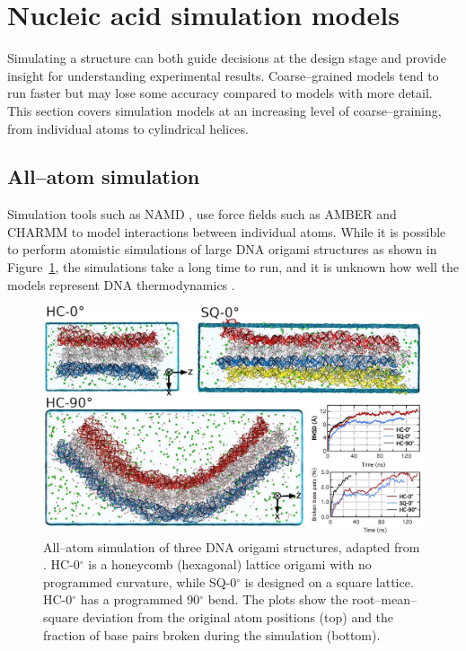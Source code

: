 \section{Nucleic acid simulation models}
Simulating a structure can both guide decisions at the design stage and provide insight for understanding experimental results. Coarse--grained models tend to run faster but may lose some accuracy compared to models with more detail. This section covers simulation models at an increasing level of coarse--graining, from individual atoms to cylindrical helices.

\subsection{All--atom simulation}
Simulation tools such as NAMD \cite{NAMDphillips2005scalable}, use force fields such as AMBER \cite{AMBERcornell1996second} and CHARMM \cite{brooks1983charmm} to model interactions between individual atoms. While it is possible to perform atomistic simulations of large DNA origami structures \cite{yoo2013situ} as shown in Figure~\ref{fig:all-atom}, the simulations take a long time to run, and it is unknown how well the models represent DNA thermodynamics \cite{sengar2021primer}.


\begin{figure}[ht]
  \begin{center}
    \includegraphics[width=\textwidth]{figures/all-atom.jpg}
    \caption{All--atom simulation of three DNA origami structures, adapted from \cite{yoo2013situ}. HC-0$^{\circ}$ is a honeycomb (hexagonal) lattice origami with no programmed curvature, while SQ-0$^{\circ}$ is designed on a square lattice. HC-0$^{\circ}$ has a programmed 90$^{\circ}$ bend. The plots show the root--mean--square deviation from the original atom positions (top) and the fraction of base pairs broken during the simulation (bottom).}
    \label{fig:all-atom}
  \end{center}
\end{figure}

